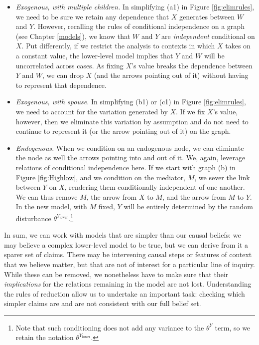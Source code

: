 \documentclass[
  12pt,
]{book}
\providecommand{\tightlist}{%
  \setlength{\itemsep}{0pt}\setlength{\parskip}{0pt}}
\begin{document}
\begin{itemize}
\tightlist
\item
  \emph{Exogenous, with multiple children.} In simplifying (a1) in Figure \ref{fig:elimrules}, we need to be sure we retain any dependence that \(X\) generates between \(W\) and \(Y\). However, recalling the rules of conditional independence on a graph (see Chapter \ref{models}), we know that \(W\) and \(Y\) are \emph{independent} conditional on \(X\). Put differently, if we restrict the analysis to contexts in which \(X\) takes on a constant value, the lower-level model implies that \(Y\) and \(W\) will be uncorrelated across cases. As fixing \(X\)'s value breaks the dependence between \(Y\) and \(W\), we can drop \(X\) (and the arrows pointing out of it) without having to represent that dependence.
\item
  \emph{Exogenous, with spouse.} In simplifying (b1) or (c1) in Figure \ref{fig:elimrules}, we need to account for the variation generated by \(X\). If we fix \(X\)'s value, however, then we eliminate this variation by assumption and do not need to continue to represent it (or the arrow pointing out of it) on the graph.
\item
  \emph{Endogenous.} When we condition on an endogenous node, we can eliminate the node as well the arrows pointing into and out of it. We, again, leverage relations of conditional independence here. If we start with graph (b) in Figure \ref{fig:Highlow}, and we condition on the mediator, \(M\), we sever the link between \(Y\) on \(X\), rendering them conditionally independent of one another. We can thus remove \(M\), the arrow from \(X\) to \(M\), and the arrow from \(M\) to \(Y\). In the new model, with \(M\) fixed, \(Y\) will be entirely determined by the random disturbance \(\theta^{Y_\text{lower}}\).\footnote{Note that such conditioning does not add any variance to the \(\theta^Y\) term, so we retain the notation \(\theta^{Y_\text{lower}}\).}
\end{itemize}

In sum, we can work with models that are simpler than our causal beliefs: we may believe a complex lower-level model to be true, but we can derive from it a sparer set of claims. There may be intervening causal steps or features of context that we believe matter, but that are not of interest for a particular line of inquiry. While these can be removed, we nonetheless have to make sure that their \emph{implications} for the relations remaining in the model are not lost. Understanding the rules of reduction allow us to undertake an important task: checking which simpler claims are and are not consistent with our full belief set.
\end{document}
